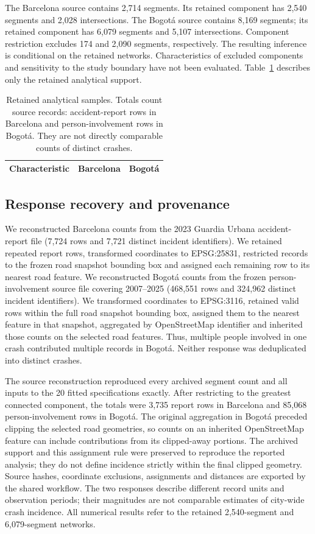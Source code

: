 \documentclass[11pt]{article}
\begin{document}
The Barcelona source contains 2,714 segments. Its retained component has 2,540 segments and 2,028 intersections. The Bogot\'a source contains 8,169 segments; its retained component has 6,079 segments and 5,107 intersections. Component restriction excludes 174 and 2,090 segments, respectively. The resulting inference is conditional on the retained networks. Characteristics of excluded components and sensitivity to the study boundary have not been evaluated. Table~\ref{tab:data} describes only the retained analytical support.

\begin{table}[tb]
\centering\small
\caption{Retained analytical samples. Totals count source records: accident-report rows in Barcelona and person-involvement rows in Bogot\'a. They are not directly comparable counts of distinct crashes.}
\label{tab:data}
\begin{tabular}{lrr}\toprule
Characteristic & Barcelona & Bogot\'a\\\midrule
\end{tabular}
\end{table}

\subsection{Response recovery and provenance}
We reconstructed Barcelona counts from the 2023 Guardia Urbana accident-report file (7,724 rows and 7,721 distinct incident identifiers). We retained repeated report rows, transformed coordinates to EPSG:25831, restricted records to the frozen road snapshot bounding box and assigned each remaining row to its nearest road feature. We reconstructed Bogot\'a counts from the frozen person-involvement source file covering 2007--2025 (468,551 rows and 324,962 distinct incident identifiers). We transformed coordinates to EPSG:3116, retained valid rows within the full road snapshot bounding box, assigned them to the nearest feature in that snapshot, aggregated by OpenStreetMap identifier and inherited those counts on the selected road features. Thus, multiple people involved in one crash contributed multiple records in Bogot\'a. Neither response was deduplicated into distinct crashes.

The source reconstruction reproduced every archived segment count and all inputs to the 20 fitted specifications exactly. After restricting to the greatest connected component, the totals were 3,735 report rows in Barcelona and 85,068 person-involvement rows in Bogot\'a. The original aggregation in Bogot\'a preceded clipping the selected road geometries, so counts on an inherited OpenStreetMap feature can include contributions from its clipped-away portions. The archived support and this assignment rule were preserved to reproduce the reported analysis; they do not define incidence strictly within the final clipped geometry. Source hashes, coordinate exclusions, assignments and distances are exported by the shared workflow. The two responses describe different record units and observation periods; their magnitudes are not comparable estimates of city-wide crash incidence. All numerical results refer to the retained 2,540-segment and 6,079-segment networks.
\end{document}
